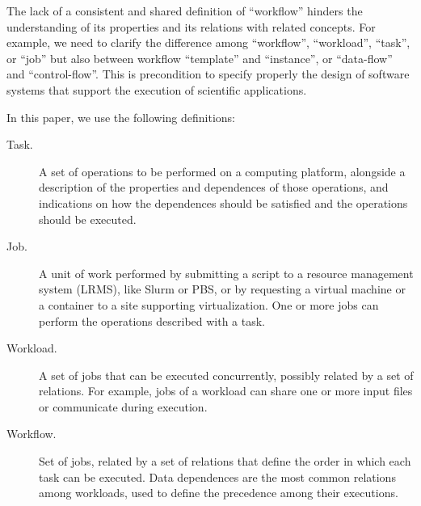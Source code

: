 The lack of a consistent and shared definition of ``workflow'' hinders the
understanding of its properties and its relations with related concepts. For
example, we need to clarify the difference among ``workflow'', ``workload'',
``task'', or ``job'' but also between workflow ``template'' and ``instance'', or
``data-flow'' and ``control-flow''. This is precondition to specify properly the
design of software systems that support the execution of scientific
applications.

In this paper, we use the following definitions:

\begin{description}

  \item[Task.] A set of operations to be performed on a computing platform,
  alongside a description of the properties and dependences of those operations,
  and indications on how the dependences should be satisfied and the operations
  should be executed.

  \item[Job.] A unit of  work performed by submitting a script to a resource
  management system (LRMS), like  Slurm or PBS, or by requesting a virtual
  machine or a container to a site supporting virtualization. One or more jobs
  can perform the operations described with a task.

  \item[Workload.] A set of jobs that can be executed concurrently, possibly
  related by a set of relations. For example, jobs of a workload can share one
  or more input files or communicate during execution.

  \item[Workflow.] Set of jobs, related by a set of relations that define the
  order in which each task can be executed. Data dependences are the most common
  relations among workloads, used to define the precedence among their
  executions.

\end{description}
